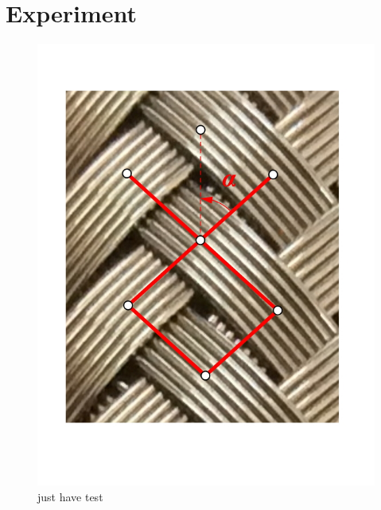 

\section{Experiment}
\label{experiment}








\begin{figure}
\centering
\includegraphics[width=0.7\linewidth]{figures/braid-angle}
\caption{ just have test}
\label{fig:braid-angle}
\end{figure}
